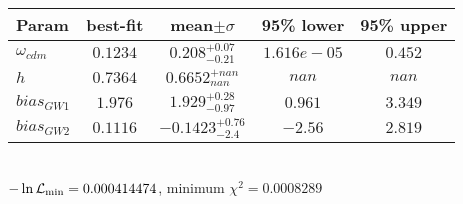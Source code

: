 \begin{tabular}{|l|c|c|c|c|} 
 \hline 
Param & best-fit & mean$\pm\sigma$ & 95\% lower & 95\% upper \\ \hline 
$\omega_{cdm }$ &$0.1234$ & $0.208_{-0.21}^{+0.07}$ & $1.616e-05$ & $0.452$ \\ 
$h$ &$0.7364$ & $0.6652_{nan}^{+nan}$ & $nan$ & $nan$ \\ 
$bias_{GW 1 }$ &$1.976$ & $1.929_{-0.97}^{+0.28}$ & $0.961$ & $3.349$ \\ 
$bias_{GW 2 }$ &$0.1116$ & $-0.1423_{-2.4}^{+0.76}$ & $-2.56$ & $2.819$ \\ 
\hline 
 \end{tabular} \\ 
$-\ln{\cal L}_\mathrm{min} =0.000414474$, minimum $\chi^2=0.0008289$ \\ 
